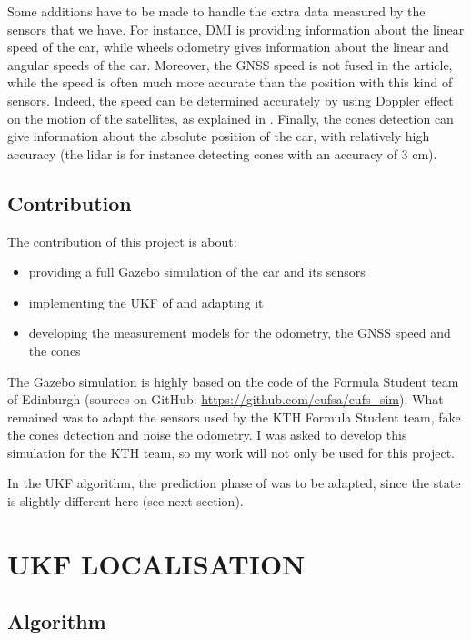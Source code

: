 \documentclass[10pt,a4paper, twocolumn]{article}
\begin{document}
Some additions have to be made to handle the extra data measured by the sensors that we have. For instance, DMI is providing information about the linear speed of the car, while wheels odometry gives information about the linear and angular speeds of the car. Moreover, the GNSS speed is not fused in the article, while the speed is often much more accurate than the position with this kind of sensors. Indeed, the speed can be determined accurately by using Doppler effect on the motion of the satellites, as explained in \cite{ GNSSVelocity}. Finally, the cones detection can give information about the absolute position of the car, with relatively high accuracy (the lidar is for instance detecting cones with an accuracy of 3 cm).


\subsection{Contribution}
The contribution of this project is about:
\begin{itemize}
	\item providing a full Gazebo simulation of the car and its sensors
	\item implementing the UKF of \cite{RobustVehicleLocalization} and adapting it
	\item developing the measurement models for the odometry, the GNSS speed and the cones
\end{itemize}

The Gazebo simulation is highly based on the code of the Formula Student team of Edinburgh (sources on GitHub: \url{https://github.com/eufsa/eufs_sim}). What remained was to adapt the sensors used by the KTH Formula Student team, fake the cones detection and noise the odometry. I was asked to develop this simulation for the KTH team, so my work will not only be used for this project.

In the UKF algorithm, the prediction phase of \cite{RobustVehicleLocalization} was to be adapted, since the state is slightly different here (see next section).


\section{UKF LOCALISATION}

\subsection{Algorithm}
\end{document}
